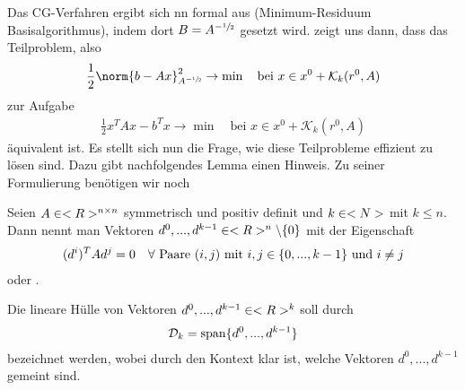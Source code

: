 Das CG-Verfahren ergibt sich nn formal aus  (Minimum-Residuum Basisalgorithmus), indem dort $B=A^{-\sfrac{1}{2}}$ gesetzt wird.  zeigt uns dann, dass das Teilproblem, also
\begin{align}
	\label{2_13}
	\frac{1}{2}\norm{b-Ax}^2_{A^{-\sfrac{1}{2}}}\to\min\quad\text{bei } x\in x^0+\mathcal{K}_k(r^0,A)
\end{align}
zur Aufgabe
\begin{align}
	\label{2_14}
	\frac{1}{2}x^TAx-b^Tx\to\min\quad\text{bei } x\in x^0+\mathcal{K}_k(r^0,A)
\end{align}
äquivalent ist. Es stellt sich nun die Frage, wie diese Teilprobleme effizient zu lösen sind. Dazu gibt nachfolgendes Lemma einen Hinweis. Zu seiner Formulierung benötigen wir noch

\begin{definition}
	Seien $A\in<R>^{n \times n}$ symmetrisch und positiv definit und $k\in<N>$ mit $k\le n$. Dann nennt man Vektoren $d^0,...,d^{k-1}\in<R>^n\backslash\{0\}$ mit der Eigenschaft
	\begin{align}
		(d^i)^TAd^j=0\quad\forall\text{ Paare } (i,j) \text{ mit } i,j\in\{0,...,k-1\} \text{ und } i\neq j\notag
	\end{align}
	 oder .
\end{definition}

Die lineare Hülle von Vektoren $d^0,...,d^{k-1}\in<R>^k$ soll durch 
\begin{align}
	\mathcal{D}_k=\operatorname{span}\{d^0,...,d^{k-1}\}\notag
\end{align}
bezeichnet werden, wobei durch den Kontext klar ist, welche Vektoren $d^0,...,d^{k-1}$ gemeint sind.

